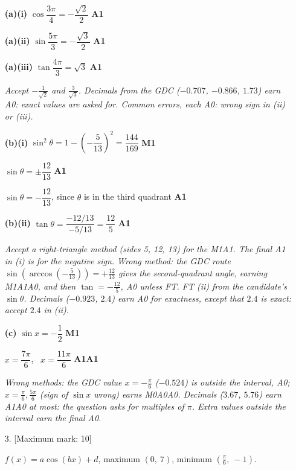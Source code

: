\documentclass[12pt, twoside]{article}
\begin{document}
\begin{enumerate}[itemsep=0.3cm]
\textbf{(a)(i)} $\cos\dfrac{3\pi}{4} = -\dfrac{\sqrt{2}}{2}$ \hfill \textbf{A1}

\textbf{(a)(ii)} $\sin\dfrac{5\pi}{3} = -\dfrac{\sqrt{3}}{2}$ \hfill \textbf{A1}

\textbf{(a)(iii)} $\tan\dfrac{4\pi}{3} = \sqrt{3}$ \hfill \textbf{A1}

\emph{Accept $-\frac{1}{\sqrt{2}}$ and $\frac{3}{\sqrt{3}}$. Decimals from
the GDC ($-0.707$, $-0.866$, $1.73$) earn A0: exact values are asked
for. Common errors, each A0: wrong sign in (ii) or (iii).}

\textbf{(b)(i)} $\sin^{2}\theta = 1 - \left(-\dfrac{5}{13}\right)^{2}
= \dfrac{144}{169}$ \hfill \textbf{M1}

$\sin\theta = \pm\dfrac{12}{13}$ \hfill \textbf{A1}

$\sin\theta = -\dfrac{12}{13}$, since $\theta$ is in the third quadrant
\hfill \textbf{A1}

\textbf{(b)(ii)} $\tan\theta = \dfrac{-12/13}{-5/13} = \dfrac{12}{5}$
\hfill \textbf{A1}

\emph{Accept a right-triangle method (sides 5, 12, 13) for the M1A1. The
final A1 in (i) is for the negative sign. Wrong method: the GDC route
$\sin\left(\arccos\left(-\frac{5}{13}\right)\right) = +\frac{12}{13}$
gives the second-quadrant angle, earning M1A1A0, and then
$\tan = -\frac{12}{5}$, A0 unless FT. FT (ii) from the candidate's
$\sin\theta$. Decimals ($-0.923$, $2.4$) earn A0 for exactness, except
that $2.4$ is exact: accept $2.4$ in (ii).}

\textbf{(c)} $\sin x = -\dfrac{1}{2}$ \hfill \textbf{M1}

$x = \dfrac{7\pi}{6}$, \ $x = \dfrac{11\pi}{6}$ \hfill \textbf{A1A1}

\emph{Wrong methods: the GDC value $x = -\frac{\pi}{6}$ ($-0.524$) is
outside the interval, A0; $x = \frac{\pi}{6}, \frac{5\pi}{6}$ (sign of
$\sin x$ wrong) earns M0A0A0. Decimals ($3.67$, $5.76$) earn A1A0 at most:
the question asks for multiples of $\pi$. Extra values outside the
interval earn the final A0.}

\newpage

\item[3.] [Maximum mark: 10]

$f(x) = a\cos(bx) + d$, maximum $(0,\ 7)$, minimum
$\left(\frac{\pi}{6},\ -1\right)$.


\end{enumerate}
\end{document}
